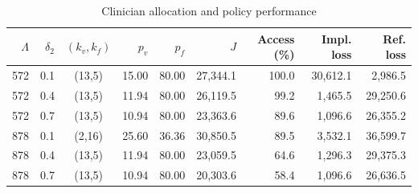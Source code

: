 \begin{table}[ht]
\centering\footnotesize
\caption{Clinician allocation and policy performance}\label{tab:staffing}
\begin{tabular}{@{}rrcrrrrrr@{}}\toprule
$\Lambda$ & $\delta_2$ & $(k_v,k_f)$ & $p_v$ & $p_f$ & $J$ & Access (\%) & Impl. loss & Ref. loss\\\midrule
572 & 0.1 & (13,5) & 15.00 & 80.00 & 27,344.1 & 100.0 & 30,612.1 & 2,986.5\\
572 & 0.4 & (13,5) & 11.94 & 80.00 & 26,119.5 & 99.2 & 1,465.5 & 29,250.6\\
572 & 0.7 & (13,5) & 10.94 & 80.00 & 23,363.6 & 89.6 & 1,096.6 & 26,355.2\\
878 & 0.1 & (2,16) & 25.60 & 36.36 & 30,850.5 & 89.5 & 3,532.1 & 36,599.7\\
878 & 0.4 & (13,5) & 11.94 & 80.00 & 23,059.5 & 64.6 & 1,296.3 & 29,375.3\\
878 & 0.7 & (13,5) & 10.94 & 80.00 & 20,303.6 & 58.4 & 1,096.6 & 26,636.5\\
\bottomrule\end{tabular}
\end{table}
